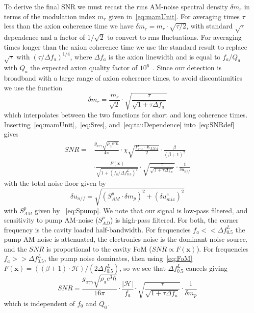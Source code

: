\documentclass[
  aps,
  physrev,
  reprint,
  superscriptaddress,
  nofootinbib,
  amsmath,
  amssymb
]{revtex4-2}
\begin{document}
To derive the final SNR we must recast the rms AM-noise spectral density $\delta m_r$ in terms of the modulation index $m_r$ given in~\eqref{eq:mamUnit}. For averaging times $\tau$ less than the axion coherence time we have
$\delta m_r = m_r \cdot \sqrt{\tau/2}$, with standard $\sqrt{\tau}$ dependence and a factor of $1/\sqrt{2}$ to convert to rms fluctuations. For averaging times longer than the axion coherence time we use the standard result to replace $\sqrt{\tau}$ with $(\tau/\Delta f_a)^{1/4}$, where $\Delta f_a$ is the axion linewidth and is equal to $f_a/Q_a$ with $Q_a$ the expected axion quality factor of $10^6$~\cite{sikivie_invisible_2021}. Since our detection is broadband with a large range of axion coherence times, to avoid discontinuities we use the function
\begin{equation} \label{eq:tauDependence}
    \delta m_r = \frac{m_r}{\sqrt{2}}\cdot\sqrt{\frac{\tau}{\sqrt{1 +\tau\Delta f_a}}}
\end{equation}
which interpolates between the two functions for short and long coherence times. Inserting~\eqref{eq:mamUnit},~\eqref{eq:Sres}, and~\eqref{eq:tauDependence} into~\eqref{eq:SNRdef} gives
\begin{equation} \label{eq:SNRfinal}
    \boxed{
        \begin{aligned}
            SNR =& \frac{g_{a\gamma\gamma}\sqrt{\rho_a c^3 \hbar}}{4 \pi} \cdot\chi \sqrt{\frac{P_{inc} \cdot K_{LNA}}{2}}\cdot \frac{\beta}{(\beta+1)^{2}} \\
            &\cdot\frac{F(\mathbf{x})}{\sqrt{1 + (f_a/\Delta f_{0.5}^L)^2}}\cdot\sqrt{\frac{\tau}{\sqrt{1+\tau \Delta f_a}}}\cdot\frac{1}{\delta u_{n/f}}
        \end{aligned}
    }
\end{equation}
with the total noise floor given by
\begin{equation} \label{eq:NFfinal}
    \delta u_{n/f}  =  \sqrt{(S_{AM}^p\cdot \delta m_p)^2 + (\delta u_{mix}^e)^2}
\end{equation}
with $S_{AM}^p$ given by ~\eqref{eq:Spump}. We note that our signal is low-pass filtered, and sensitivity to pump AM-noise ($S_{AD}^p$) is high-pass filtered. For both, the corner frequency is the cavity loaded half-bandwidth. For frequencies $f_a << \Delta f_{0.5}^L$ the pump AM-noise is attenuated, the electronics noise is the dominant noise source, and the $SNR$ is proportional to the cavity FoM ($SNR \propto F(\mathbf{x})$). For frequencies $f_a >>\Delta f_{0.5}^L$, the pump noise dominates, then using~\eqref{eq:FoM} $F(\mathbf{x}) = ((\beta +1)\cdot\mathscr{H})/(2\Delta f_{0.5}^L)$, so we see that $\Delta f_{0.5}^L$ cancels giving
\begin{equation} \label{eq:SNRpump}
    SNR = \frac{g_{a\gamma\gamma}\sqrt{\rho_a c^3 \hbar}}{16 \pi} \cdot\frac{|\mathscr{H}|}{f_a}\cdot\sqrt{\frac{\tau}{\sqrt{1+\tau \Delta f_a}}}\cdot\frac{1}{\delta m_p}
\end{equation}
which is independent of $f_0$ and $Q_0$. 
\end{document}
